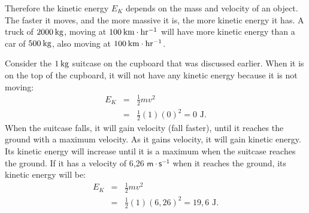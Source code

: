 Therefore the kinetic energy $E_{K}$ depends on the mass and velocity of an object. 
The faster it moves, and the more massive it is, the more kinetic energy it has. 
A truck of $2 000\phantom{\rule{2pt}{0ex}}\text{kg}$, moving at $100\phantom{\rule{2pt}{0ex}}\text{km}\ensuremath{\cdot}\text{hr}{}^{-1}$ will have more kinetic energy than a car of $500\phantom{\rule{2pt}{0ex}}\text{kg}$, also moving at $100\phantom{\rule{2pt}{0ex}}\text{km}\ensuremath{\cdot}\text{hr}{}^{-1}$. 
      \label{m38785*eip-368}
      \label{m38785*uid62}\nopagebreak\noindent{}

      \label{m38785*id66902}Consider the $1\phantom{\rule{2pt}{0ex}}\text{kg}$ suitcase on the cupboard that was discussed earlier.
When it is on the top of the cupboard, it will not have any kinetic energy because it is not moving:
\begin{eqnarray*}
E_{K} &=& \frac{1}{2}mv^{2} \\
& = & \frac{1}{2}(1)(0)^{2} = 0 \text{ J}.
\end{eqnarray*}
When the suitcase falls, it will gain velocity (fall faster), until it reaches the ground with a maximum velocity.  
As it gains velocity, it will gain kinetic energy. 
Its kinetic energy will increase until it is a maximum when the suitcase reaches the ground.
If it has a velocity of 6,26 $\mathsf{m \cdot s^{-1}}$ when it reaches the ground, its kinetic energy will be:
\begin{eqnarray*}
E_{K} &=& \frac{1}{2}mv^{2} \\
& = & \frac{1}{2}(1)(6,26)^{2} = 19,6 \text{ J}.
\end{eqnarray*}

